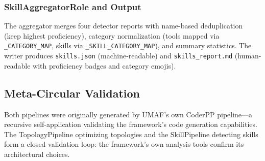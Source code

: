 \subsubsection{SkillAggregatorRole and Output}

\raggedright
The aggregator merges four detector reports with name-based deduplication (keep highest proficiency), category normalization (tools mapped via \texttt{\_CATEGORY\_MAP}, skills via \texttt{\_SKILL\_CATEGORY\_MAP}), and summary statistics. The writer produces \texttt{skills.json} (machine-readable) and \texttt{skills\_report.md} (human-readable with proficiency badges and category emojis).

\subsection{Meta-Circular Validation}

Both pipelines were originally generated by UMAF's own CoderPP pipeline---a recursive self-application validating the framework's code generation capabilities. The TopologyPipeline optimizing topologies and the SkillPipeline detecting skills form a closed validation loop: the framework's own analysis tools confirm its architectural choices.
